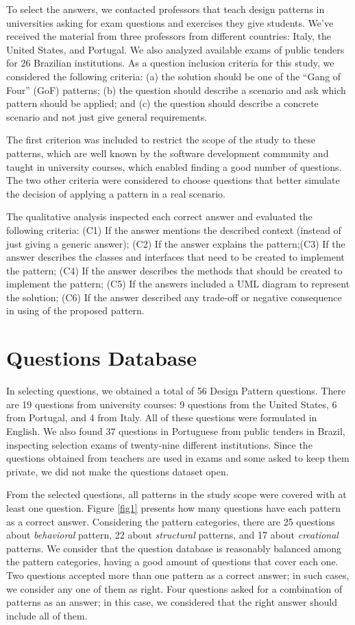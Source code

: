 \documentclass[runningheads]{llncs}
\begin{document}
To select the answers, we contacted professors that teach design patterns in universities asking for exam questions and exercises they give students. We've received the material from three professors from different countries: Italy, the United States, and Portugal. We also analyzed available exams of public tenders for 26 Brazilian institutions. As a question inclusion criteria for this study, we considered the following criteria: (a) the solution should be one of the “Gang of Four” (GoF) patterns; (b) the question should describe a scenario and ask which pattern should be applied; and (c) the question should describe a concrete scenario and not just give general requirements. 

The first criterion was included to restrict the scope of the study to these patterns, which are well known by the software development community and taught in university courses, which enabled finding a good number of questions. The two other criteria were considered to choose questions that better simulate the decision of applying a pattern in a real scenario.

The qualitative analysis inspected each correct answer and evaluated the following criteria: (C1) If the answer mentions the described context (instead of just giving a generic answer); (C2) If the answer explains the pattern;(C3) If the answer describes the classes and interfaces that need to be created to implement the pattern; (C4) If the answer describes the methods that should be created to implement the pattern; (C5) If the answers included a UML diagram to represent the solution; (C6) If the answer described any trade-off or negative consequence in using of the proposed pattern.

\section{Questions Database}\label{sec3}

In selecting questions, we obtained a total of 56 Design Pattern questions. There are 19 questions from university courses: 9 questions from the United States, 6 from Portugal, and 4 from Italy. All of these questions were formulated in English. We also found 37 questions in Portuguese from public tenders in Brazil, inspecting selection exams of twenty-nine different institutions. Since the questions obtained from teachers are used in exams and some asked to keep them private, we did not make the questions dataset open. 

From the selected questions, all patterns in the study scope were covered with at least one question. Figure \ref{fig1} presents how many questions have each pattern as a correct answer. Considering the pattern categories, there are 25 questions about \textit{behavioral} pattern, 22 about \textit{structural} patterns, and 17 about \textit{creational} patterns. We consider that the question database is reasonably balanced among the pattern categories, having a good amount of questions that cover each one. Two questions accepted more than one pattern as a correct answer; in such cases, we consider any one of them as right. Four questions asked for a combination of patterns as an answer; in this case, we considered that the right answer should include all of them.
  
\end{document}
